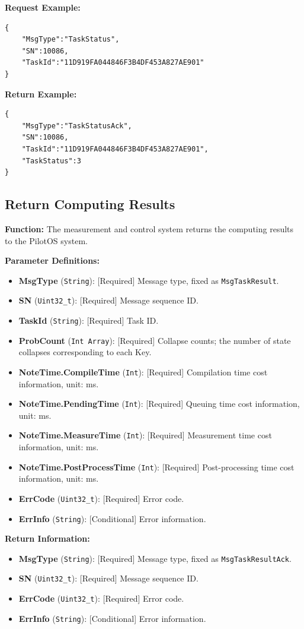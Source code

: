 \documentclass[12pt, a4paper]{article}
\begin{document}
\noindent \textbf{Request Example:}
\begin{lstlisting}
{
    "MsgType":"TaskStatus",
    "SN":10086,
    "TaskId":"11D919FA044846F3B4DF453A827AE901"
}
\end{lstlisting}

\noindent \textbf{Return Example:}
\begin{lstlisting}
{
    "MsgType":"TaskStatusAck",
    "SN":10086,
    "TaskId":"11D919FA044846F3B4DF453A827AE901",
    "TaskStatus":3
}
\end{lstlisting}

\subsection{Return Computing Results}

\textbf{Function:} The measurement and control system returns the computing results to the PilotOS system.

\textbf{Parameter Definitions:}
\begin{itemize}
    \item \textbf{MsgType} (\texttt{String}): [Required] Message type, fixed as \texttt{MsgTaskResult}.
    \item \textbf{SN} (\texttt{Uint32\_t}): [Required] Message sequence ID.
    \item \textbf{TaskId} (\texttt{String}): [Required] Task ID.
    \item \textbf{ProbCount} (\texttt{Int Array}): [Required] Collapse counts; the number of state collapses corresponding to each Key.
    \item \textbf{NoteTime.CompileTime} (\texttt{Int}): [Required] Compilation time cost information, unit: ms.
    \item \textbf{NoteTime.PendingTime} (\texttt{Int}): [Required] Queuing time cost information, unit: ms.
    \item \textbf{NoteTime.MeasureTime} (\texttt{Int}): [Required] Measurement time cost information, unit: ms.
    \item \textbf{NoteTime.PostProcessTime} (\texttt{Int}): [Required] Post-processing time cost information, unit: ms.
    \item \textbf{ErrCode} (\texttt{Uint32\_t}): [Required] Error code.
    \item \textbf{ErrInfo} (\texttt{String}): [Conditional] Error information.
\end{itemize}

\textbf{Return Information:}
\begin{itemize}
    \item \textbf{MsgType} (\texttt{String}): [Required] Message type, fixed as \texttt{MsgTaskResultAck}.
    \item \textbf{SN} (\texttt{Uint32\_t}): [Required] Message sequence ID.
    \item \textbf{ErrCode} (\texttt{Uint32\_t}): [Required] Error code.
    \item \textbf{ErrInfo} (\texttt{String}): [Conditional] Error information.
\end{itemize}
\end{document}
